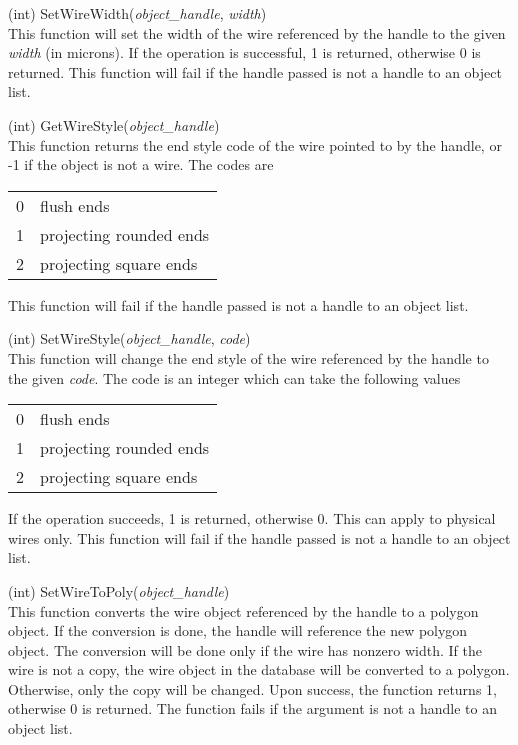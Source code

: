 \begin{description}
\item{(int) \vt SetWireWidth({\it object\_handle\/}, {\it width\/})}\\
This function will set the width of the wire referenced by the handle
to the given {\it width} (in microns).  If the operation is
successful, 1 is returned, otherwise 0 is returned.  This function
will fail if the handle passed is not a handle to an object list.

\item{(int) \vt GetWireStyle({\it object\_handle\/})}\\
This function returns the end style code of the wire pointed to by the
handle, or -1 if the object is not a wire.  The codes are

\begin{tabular}{ll}\\
0 & flush ends\\
1 & projecting rounded ends\\
2 & projecting square ends
\end{tabular}

This function will fail if the handle passed is not a handle to an
object list.

\item{(int) \vt SetWireStyle({\it object\_handle\/}, {\it code\/})}\\
This function will change the end style of the wire referenced by the
handle to the given {\it code}.  The code is an integer which can take
the following values

\begin{tabular}{ll}\\
0 & flush ends\\
1 & projecting rounded ends\\
2 & projecting square ends
\end{tabular}

If the operation succeeds, 1 is returned, otherwise 0.  This can apply
to physical wires only.  This function will fail if the handle passed
is not a handle to an object list.

\item{(int) \vt SetWireToPoly({\it object\_handle\/})}\\
This function converts the wire object referenced by the handle to a
polygon object.  If the conversion is done, the handle will reference
the new polygon object.  The conversion will be done only if the wire
has nonzero width.  If the wire is not a copy, the wire object in the
database will be converted to a polygon.  Otherwise, only the copy
will be changed.  Upon success, the function returns 1, otherwise 0 is
returned.  The function fails if the argument is not a handle to an
object list.


\end{description}

